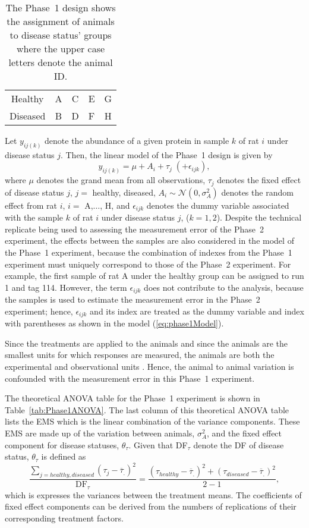 \documentclass[article]{jss}
\begin{document}
\begin{table}[ht]
\centering
\caption{The Phase~1 design shows the assignment of animals to disease status' groups where the upper case letters denote the animal ID.}
\begin{tabular}[t]{ccccc}
\hline 
Healthy & A & C & E & G \\ 
Diseased & B & D & F & H \\ 
\hline 
\end{tabular} 
\label{tab:phase1Design}
\end{table}

Let $y_{ij(k)}$ denote the abundance of a given protein in sample $k$ of rat $i$ under disease status $j$. Then, the linear model of the Phase~1 design is given by
\begin{equation}\label{eq:phase1Model}
y_{ij(k)}= \mu + A_{i} + \tau_{j} \; (+ \epsilon_{ijk} ),
\end{equation}
where $\mu$ denotes the grand mean from all observations, $\tau_{j}$ denotes the fixed effect of disease status $j$, $j=$ healthy, diseased, $A_{i} \sim \mathcal{N}(0, \sigma_{A}^2)$ denotes the random effect from rat $i$, $i=$ A,$\dots$, H, and $\epsilon_{ijk}$ denotes the dummy variable associated with the sample $k$ of rat $i$ under disease status $j$, ($k = 1, 2$). Despite the technical replicate being used to assessing the measurement error of the Phase~2 experiment, the effects between the samples are also considered in the model of the Phase~1 experiment, because the combination of indexes from the Phase~1 experiment must uniquely correspond to those of the Phase~2 experiment. For example, the first sample of rat A under the healthy group can be assigned to run 1 and tag 114. However, the term $\epsilon_{ijk}$ does not contribute to the analysis, because the samples is used to estimate the measurement error in the Phase~2 experiment; hence, $\epsilon_{ijk}$ and its index are treated as the dummy variable and index with parentheses as shown in the model (\ref{eq:phase1Model}). 

Since the treatments are applied to the animals and since the animals are the smallest units for which responses are measured, the animals are both the experimental and observational units \citep{Bailey2008}. Hence, the animal to animal variation is confounded with the measurement error in this Phase~1 experiment. 

The theoretical ANOVA table for the Phase~1 experiment is shown in Table~\ref{tab:Phase1ANOVA}. The last column of this theoretical ANOVA table lists the EMS which is the linear combination of the variance components. These EMS are made up of the variation between animals, $\sigma_{A}^2$, and the fixed effect component for disease statuses, $\theta_{\tau}$. Given that DF$_{\tau}$ denote the DF of disease status, $\theta_{\tau}$ is defined as 
\[\frac{\displaystyle \sum_{j = healthy, diseased}(\tau_{j} - \overline{\tau}_{.})^2}{\mathrm{DF}_{\tau}}=
\frac{(\tau_{healthy} - \overline{\tau}_{.})^2 + (\tau_{diseased} - \overline{\tau}_{.})^2}{2-1},\] 
which is expresses the variances between the treatment means. The coefficients of fixed effect components can be derived from the numbers of replications of their corresponding treatment factors. 
\end{document}
